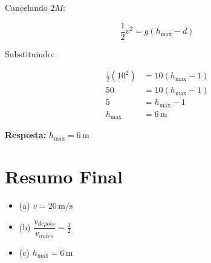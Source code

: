 \documentclass[a4paper,12pt]{article}
\newcommand{\printingbibliography}{%

    \pagestyle{myheadings}
    \markright{}
    \sloppy
    \printbibliography[heading=bibintoc, %
                   title=Refer\^encias %
                  ]
    \fussy%
}
\begin{document}
Cancelando $2M$:

\begin{equation}
\frac{1}{2}v^2 = g(h_{\max} - d)
\end{equation}

Substituindo:

\begin{align}
\frac{1}{2}(10^2) &= 10(h_{\max} - 1) \\
50 &= 10(h_{\max} - 1) \\
5 &= h_{\max} - 1 \\
h_{\max} &= 6 \, \text{m}
\end{align}

\textbf{Resposta:} $h_{\max} = 6 \, \text{m}$

\vspace{0.5cm}

\section*{Resumo Final}

\begin{itemize}
\item (a) $v = 20 \, \text{m/s}$
\item (b) $\dfrac{v_{depois}}{v_{antes}} = \frac{1}{2}$
\item (c) $h_{\max} = 6 \, \text{m}$
\end{itemize}

\end{document}
